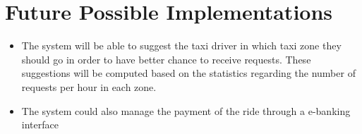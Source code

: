 \section{Future Possible Implementations}
\begin{itemize}
	\item The system will be able to suggest the taxi driver in which taxi zone they should go in order to have better chance to receive requests. These suggestions will be computed based on the statistics regarding the number of requests per hour in each zone.
	\item The system could also manage the payment of the ride through a e-banking interface
\end{itemize}
